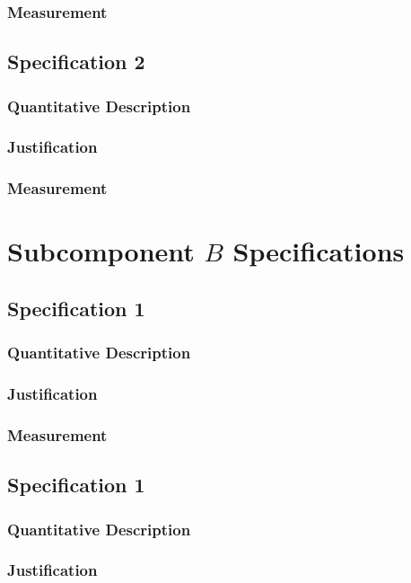 \documentclass[11pt, oneside]{article}   	%
\begin{document}
\subsubsection{Measurement}

\subsection{Specification 2}
\subsubsection{Quantitative Description}
\subsubsection{Justification}
\subsubsection{Measurement}

\section{Subcomponent $B$ Specifications}

\subsection{Specification 1}
\subsubsection{Quantitative Description}
\subsubsection{Justification}
\subsubsection{Measurement}

\subsection{Specification 1}
\subsubsection{Quantitative Description}
\subsubsection{Justification}
\end{document}
